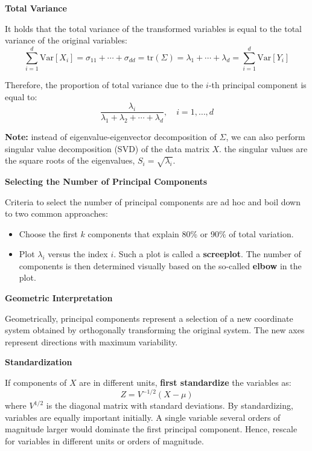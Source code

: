 \documentclass[12pt,a4paper]{article}
\begin{document}
\vspace{0.5em}

\textbf{Total Variance}

It holds that the total variance of the transformed variables is equal to the total variance of the original variables:
\[
\sum_{i=1}^{d} \text{Var}[X_i] = \sigma_{11} + \cdots + \sigma_{dd} = \text{tr}(\Sigma) = \lambda_1 + \cdots + \lambda_d = \sum_{i=1}^{d} \text{Var}[Y_i]
\]

Therefore, the proportion of total variance due to the $i$-th principal component is equal to:
\[
\frac{\lambda_i}{\lambda_1 + \lambda_2 + \cdots + \lambda_d}, \quad i = 1, \ldots, d
\]

\vspace{0.5em}

\textbf{Note:} instead of eigenvalue-eigenvector decomposition of $\Sigma$, we can also perform singular value decomposition (SVD) of the data matrix $X$. the singular values are the square roots of the eigenvalues,  $S_i = \sqrt{\lambda_i}$.

\vspace{0.5em}

\textbf{Selecting the Number of Principal Components}

Criteria to select the number of principal components are ad hoc and boil down to two common approaches:

\begin{itemize}
    \item Choose the first $k$ components that explain 80\% or 90\% of total variation.
    \item Plot $\lambda_i$ versus the index $i$. Such a plot is called a \textbf{screeplot}. The number of components is then determined visually based on the so-called \textbf{elbow} in the plot.
\end{itemize}

\vspace{0.5em}

\textbf{Geometric Interpretation}

Geometrically, principal components represent a selection of a new coordinate system obtained by orthogonally transforming the original system. The new axes represent directions with maximum variability.

\vspace{0.5em}

\textbf{Standardization}

If components of $X$ are in different units, \textbf{first standardize} the variables as:
\[
Z = V^{-1/2}(X - \mu)
\]
where $V^{1/2}$ is the diagonal matrix with standard deviations. By standardizing, variables are equally important initially. A single variable several orders of magnitude larger would dominate the first principal component. Hence, rescale for variables in different units or orders of magnitude. 
\end{document}
